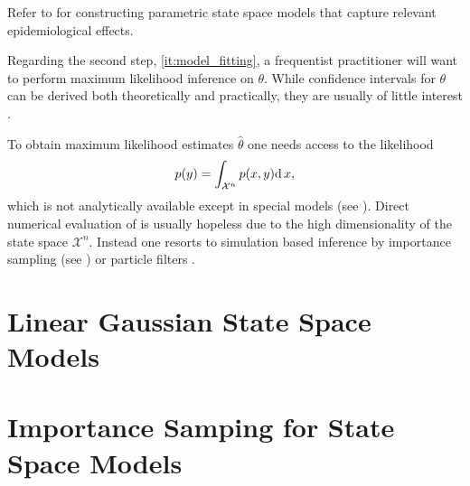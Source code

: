 Refer to  for constructing parametric state space models that capture relevant epidemiological effects.

Regarding the second step, \cref{it:model_fitting}, a frequentist practitioner will want to perform maximum likelihood inference on $\theta$.
While confidence intervals for $\theta$ can be derived both theoretically and practically, they are usually of little interest .

To obtain maximum likelihood estimates $\hat\theta$ one needs access to the likelihood 
\begin{align}
    \label{eq:likelihood}
    p(y) = \int_{\mathcal X^n} p(x,y) \mathrm d\, x,
\end{align}
which is not analytically available except in special models (see ).
Direct numerical evaluation of  is usually hopeless due to the high dimensionality of the state space $\mathcal X^n$. 
Instead one resorts to simulation based inference by importance sampling (see ) or particle filters .

\section{Linear Gaussian State Space Models}
\label{sec:lgssm}

\section{Importance Samping for State Space Models}
\label{sec:is_for_ssm}